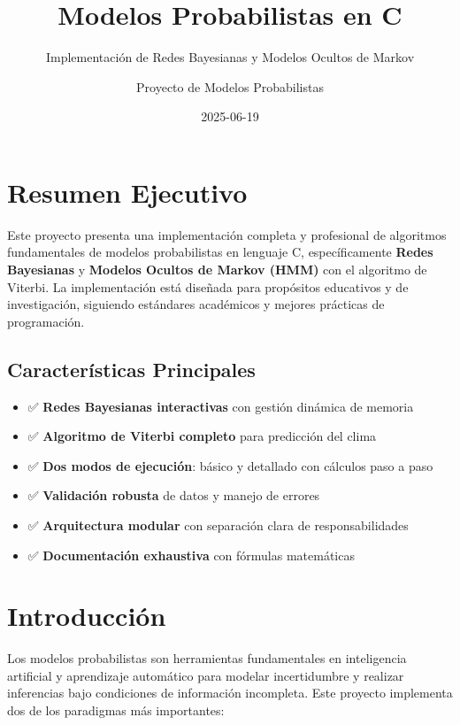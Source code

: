 \documentclass[
]{article}
\title{Modelos Probabilistas en C}
\subtitle{Implementación de Redes Bayesianas y Modelos Ocultos de
Markov}
\author{Proyecto de Modelos Probabilistas}
\date{2025-06-19}
\providecommand{\tightlist}{%
  \setlength{\itemsep}{0pt}\setlength{\parskip}{0pt}}
\begin{document}
\maketitle


\section{Resumen Ejecutivo}\label{resumen-ejecutivo}

Este proyecto presenta una implementación completa y profesional de
algoritmos fundamentales de modelos probabilistas en lenguaje C,
específicamente \textbf{Redes Bayesianas} y \textbf{Modelos Ocultos de
Markov (HMM)} con el algoritmo de Viterbi. La implementación está
diseñada para propósitos educativos y de investigación, siguiendo
estándares académicos y mejores prácticas de programación.

\subsection{Características
Principales}\label{caracteruxedsticas-principales}

\begin{itemize}
\tightlist
\item
  ✅ \textbf{Redes Bayesianas interactivas} con gestión dinámica de
  memoria
\item
  ✅ \textbf{Algoritmo de Viterbi completo} para predicción del clima
\item
  ✅ \textbf{Dos modos de ejecución}: básico y detallado con cálculos
  paso a paso
\item
  ✅ \textbf{Validación robusta} de datos y manejo de errores
\item
  ✅ \textbf{Arquitectura modular} con separación clara de
  responsabilidades
\item
  ✅ \textbf{Documentación exhaustiva} con fórmulas matemáticas
\end{itemize}

\section{Introducción}\label{introducciuxf3n}

Los modelos probabilistas son herramientas fundamentales en inteligencia
artificial y aprendizaje automático para modelar incertidumbre y
realizar inferencias bajo condiciones de información incompleta. Este
proyecto implementa dos de los paradigmas más importantes:
\end{document}
